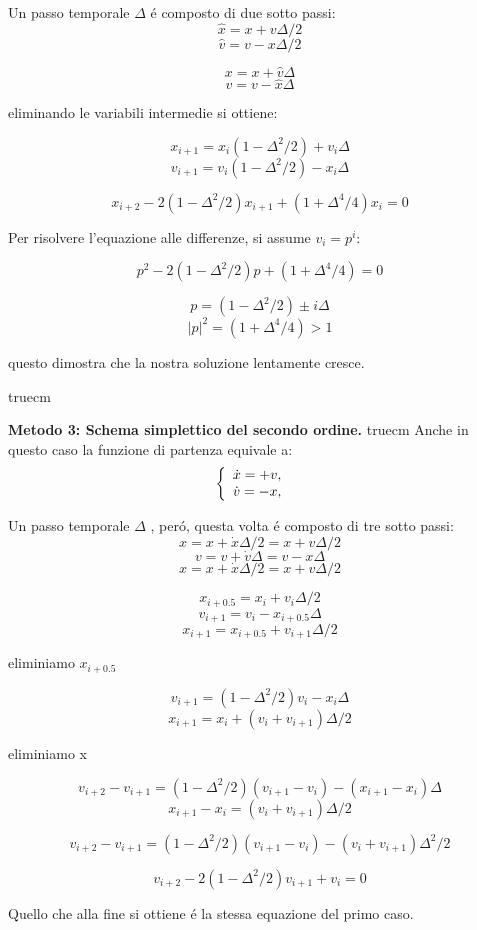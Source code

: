\documentclass[11pt,a4paper,twoside]{book}
\begin{document}
Un passo temporale $\Delta$ \'e composto di due sotto passi:
$$ \hat{x}=x+v\Delta/2 $$
$$ \hat{v}=v-x\Delta/2 $$

$$ x=x+\hat{v}\Delta $$
$$ v=v-\hat{x}\Delta $$

eliminando le variabili intermedie si ottiene:

$$ x_{i+1}=x_i(1-\Delta^2/2)+v_i\Delta $$
$$ v_{i+1}=v_i(1-\Delta^2/2)-x_i\Delta $$

$$ x_{i+2}-2(1-\Delta^2/2)x_{i+1} +(1+\Delta^4/4)x_i=0 $$

Per risolvere l'equazione alle differenze, si assume $ v_i=p^i $:

$$ p^2-2(1-\Delta^2/2)p+(1+\Delta^4/4)=0 $$

$$ p= (1-\Delta^2/2)\pm i\Delta $$
$$ |p|^2 = (1+\Delta^4/4) > 1 $$

questo dimostra che la nostra soluzione lentamente cresce.

 truecm

\textbf{Metodo 3: Schema simplettico del secondo ordine. }  truecm Anche in questo caso la funzione di partenza equivale a:
\begin{displaymath} \left\{
  \begin{array}{ll}
    \dot{x}=+v, & \hbox{} \\
    \dot{v}=-x, & \hbox{}
  \end{array}
\right. \end{displaymath}



Un passo temporale $\Delta$ , per\'o, questa volta \'e composto di
tre sotto passi:
$$ x=x+\dot{x}\Delta/2=x+v\Delta/2 $$
$$ v=v+\dot{v}\Delta=v-x\Delta $$
$$ x=x+\dot{x}\Delta/2=x+v\Delta/2 $$



$$ x_{i+0.5}=x_i+v_i\Delta/2 $$
$$ v_{i+1}=v_i-x_{i+0.5}\Delta $$
$$ x_{i+1}=x_{i+0.5}+v_{i+1}\Delta/2 $$

eliminiamo $ x_{i+0.5} $

$$ v_{i+1}= (1-\Delta^2/2)v_i-x_i\Delta $$
$$ x_{i+1}= x_i+(v_i+v_{i+1})\Delta/2 $$

eliminiamo x

$$ v_{i+2}-v_{i+1}= (1-\Delta^2/2)(v_{i+1}-v_i)-(x_{i+1}-x_i)\Delta $$
$$ x_{i+1}-x_i=(v_i+v_{i+1})\Delta/2 $$

$$ v_{i+2}-v_{i+1}= (1-\Delta^2/2)(v_{i+1}-v_i)-(v_i+v_{i+1})\Delta^2/2 $$

$$ v_{i+2}-2(1-\Delta^2/2)v_{i+1}+v_i=0 $$

Quello che alla fine si ottiene \'e la stessa equazione del primo
caso.
\end{document}
